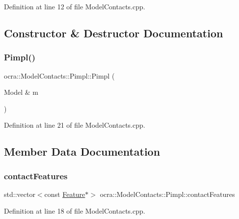 Definition at line 12 of file Model\+Contacts.\+cpp.



\subsection{Constructor \& Destructor Documentation}
\hypertarget{structocra_1_1ModelContacts_1_1Pimpl_a49e42d553f4cb66b8c6207e63733d410}{}\label{structocra_1_1ModelContacts_1_1Pimpl_a49e42d553f4cb66b8c6207e63733d410} 
\subsubsection{\texorpdfstring{Pimpl()}{Pimpl()}}
{\footnotesize\ttfamily ocra\+::\+Model\+Contacts\+::\+Pimpl\+::\+Pimpl (\begin{DoxyParamCaption}\item[{Model \&}]{m }\end{DoxyParamCaption})\hspace{0.3cm}{\ttfamily [inline]}}



Definition at line 21 of file Model\+Contacts.\+cpp.



\subsection{Member Data Documentation}
\hypertarget{structocra_1_1ModelContacts_1_1Pimpl_ac15c6469b805fa54ffb5422a7b1014bd}{}\label{structocra_1_1ModelContacts_1_1Pimpl_ac15c6469b805fa54ffb5422a7b1014bd} 
\subsubsection{\texorpdfstring{contact\+Features}{contactFeatures}}
{\footnotesize\ttfamily std\+::vector$<$const \hyperlink{classocra_1_1Feature}{Feature}$\ast$$>$ ocra\+::\+Model\+Contacts\+::\+Pimpl\+::contact\+Features}



Definition at line 18 of file Model\+Contacts.\+cpp.

